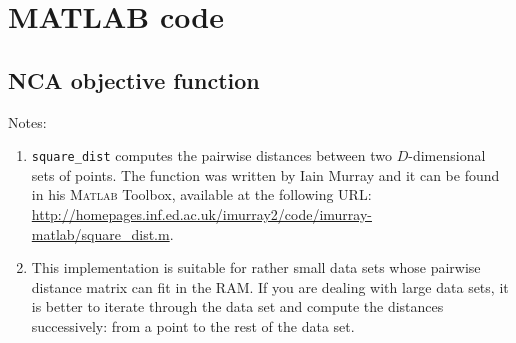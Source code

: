 \chapter{MATLAB code}

\section{NCA objective function}
\label{app:code-nca-obj}
{\singlespace \small

}

Notes: 
\begin{enumerate}
  \item \texttt{square\_dist} computes the pairwise distances between two $D$-dimensional sets of points. The function was written by Iain Murray and it can be found in his \textsc{Matlab} Toolbox, available at the following URL: \protect\url{http://homepages.inf.ed.ac.uk/imurray2/code/imurray-matlab/square_dist.m}.
  \item This implementation is suitable for rather small data sets whose pairwise distance matrix can fit in the RAM. If you are dealing with large data sets, it is better to iterate through the data set and compute the distances successively: from a point to the rest of the data set. 
\end{enumerate}

% 
